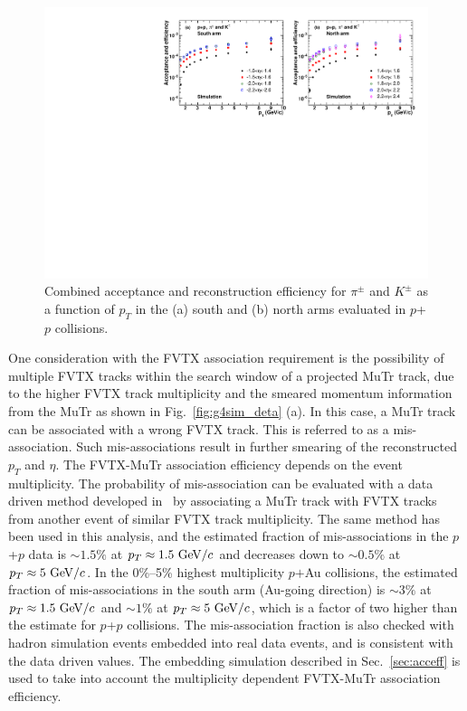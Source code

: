 \documentclass[twocolumn,letterpaper,aps,prc,longbibliography,superscriptaddress,nofootinbib,floatfix]{revtex4-2}
\newcommand{\pt}{\mbox{$p_T$}\xspace}
\newcommand{\pp}{\mbox{$p$+$p$}\xspace}
\newcommand{\pau}{\mbox{$p$$+$Au}\xspace}
\begin{document}
\begin{figure}[htb]
\includegraphics[width=0.998\linewidth]{pp_acceff_etabin_pT.pdf}
\caption{\label{fig:acceff_etabin_pp}
Combined acceptance and reconstruction efficiency for $\pi^{\pm}$ and 
$K^{\pm}$ as a function of \pt in the (a) south and (b) north arms 
evaluated in \pp collisions.}
\end{figure}

One consideration with the FVTX association requirement is the 
possibility of multiple FVTX tracks within the search window of a 
projected MuTr track, due to the higher FVTX track multiplicity and the 
smeared momentum information from the MuTr as shown in 
Fig.~\ref{fig:g4sim_deta} (a). In this case, a MuTr track can be 
associated with a wrong FVTX track. This is referred to as a 
mis-association. Such mis-associations result in further smearing of the 
reconstructed \pt and $\eta$.  The FVTX-MuTr association efficiency 
depends on the event multiplicity. The probability of mis-association 
can be evaluated with a data driven method developed 
in~\cite{Aidala:2017yte,Aidala:2017iad} by associating a MuTr track with 
FVTX tracks from another event of similar FVTX track multiplicity. The 
same method has been used in this analysis, and the estimated fraction 
of mis-associations in the \pp data is $\sim1.5\%$ at 
$\pt\approx1.5~{\rm GeV}/c$ and decreases down to $\sim0.5\%$ at 
$\pt\approx5~{\rm GeV}/c$. In the 0\%--5\% highest multiplicity \pau 
collisions, the estimated fraction of mis-associations in the south arm 
(Au-going direction) is $\sim3\%$ at $\pt\approx1.5~{\rm GeV}/c$ and 
$\sim1\%$ at $\pt\approx5~{\rm GeV}/c$, which is a factor of two higher 
than the estimate for \pp collisions. The mis-association fraction is 
also checked with hadron simulation events embedded into real data 
events, and is consistent with the data driven values. The embedding 
simulation described in Sec.~\ref{sec:acceff} is used to take into 
account the multiplicity dependent FVTX-MuTr association efficiency.
\end{document}
